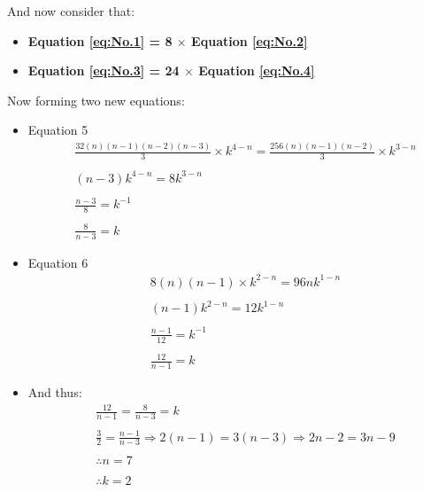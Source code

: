 \documentclass[12pt]{article}
\begin{document}
\newpage
And now consider that:
\begin{itemize}
	\item \textbf{Equation \ref{eq:No.1} = 8 $\times$ Equation \ref{eq:No.2}}
	\item \textbf{Equation \ref{eq:No.3} = 24 $\times$ Equation \ref{eq:No.4}}
\end{itemize}
Now forming two new equations:
\begin{itemize}
	\item Equation 5
	      \begin{equation}
		      \begin{split}
			       & \frac{32(n)(n-1)(n-2)(n-3)}{3} \times k^{4-n} = \frac{256(n)(n-1)(n-2)}{3} \times k^{3-n} \\ \\
			       & (n-3)k^{4-n} = 8k^{3-n}                                                                   \\ \\
			       & \frac{n-3}{8} = k^{-1}                                                                    \\ \\
			       & \frac{8}{n-3} = k
		      \end{split}
		      \label{eq:sim1}
	      \end{equation}

	\item Equation 6
	      \begin{equation}
		      \begin{split}
			       & 8(n)(n-1) \times k^{2-n} =  96nk^{1-n} \\ \\
			       & (n-1)k^{2-n} = 12k^{1-n}               \\ \\
			       & \frac{n-1}{12} = k^{-1}                \\ \\
			       & \frac{12}{n-1} = k
		      \end{split}
		      \label{eq:sim2}
	      \end{equation}

	\item And thus:
	      \begin{align*}
            & \frac{12}{n-1} = \frac{8}{n-3} = k \\ \\
            & \frac{3}{2} = \frac{n-1}{n-3} \Rightarrow 2(n-1) = 3(n-3) \Rightarrow 2n - 2 = 3n - 9 \\ \\ 
            & \therefore n = 7 \\ \\
            & \therefore k = 2
	      \end{align*}
\end{itemize}
\end{document}
